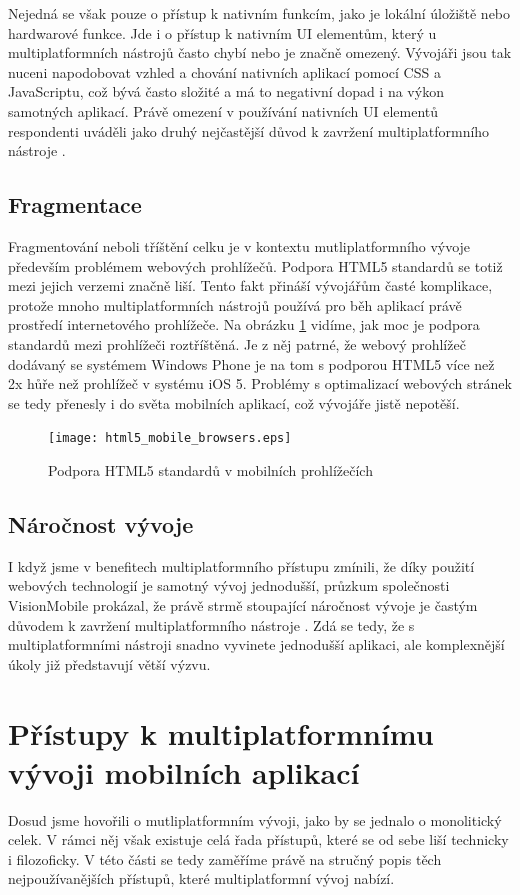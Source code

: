 Nejedná se však pouze o přístup k nativním funkcím, jako je lokální úložiště nebo hardwarové funkce. Jde i o přístup k nativním UI elementům, který u multiplatformních nástrojů často chybí nebo je značně omezený. Vývojáři jsou tak nuceni napodobovat vzhled a chování nativních aplikací pomocí CSS a JavaScriptu, což bývá často složité a má to negativní dopad i na výkon samotných aplikací. Právě omezení v používání nativních UI elementů respondenti uváděli jako druhý nejčastější důvod k zavržení multiplatformního nástroje \cite{visionmobile_survey}.

\subsection{Fragmentace}
Fragmentování neboli tříštění celku je v kontextu mutliplatformního vývoje především problémem webových prohlížečů. Podpora HTML5 standardů se totiž mezi jejich verzemi značně liší. Tento fakt přináší vývojářům časté komplikace, protože mnoho multiplatformních nástrojů používá pro běh aplikací právě prostředí internetového prohlížeče. Na obrázku \ref{fig:HTML5mobilniprohlizece} vidíme, jak moc je podpora standardů mezi prohlížeči roztříštěná. Je z něj patrné, že webový prohlížeč dodávaný se systémem Windows Phone je na tom s podporou HTML5 více než 2x hůře než prohlížeč v systému iOS 5. Problémy s optimalizací webových stránek se tedy přenesly i do světa mobilních aplikací, což vývojáře jistě nepotěší.

\begin{figure}\centering
\texttt{[image: html5\_mobile\_browsers.eps]}
\caption{Podpora HTML5 standardů v mobilních prohlížečích \cite{visionmobile_survey}}
\label{fig:HTML5mobilniprohlizece}
\end{figure}

\subsection{Náročnost vývoje}
I když jsme v benefitech multiplatformního přístupu zmínili, že díky použití webových technologií je samotný vývoj jednodušší, průzkum společnosti VisionMobile prokázal, že právě strmě stoupající náročnost vývoje je častým důvodem k zavržení multiplatformního nástroje \cite{visionmobile_survey}. Zdá se tedy, že s multiplatformními nástroji snadno vyvinete jednodušší aplikaci, ale komplexnější úkoly již představují větší výzvu.

\section{Přístupy k multiplatformnímu vývoji mobilních aplikací}
Dosud jsme hovořili o mutliplatformním vývoji, jako by se jednalo o monolitický celek. V rámci něj však existuje celá řada přístupů, které se od sebe liší technicky i filozoficky. V této části se tedy zaměříme právě na stručný popis těch nejpoužívanějších přístupů, které multiplatformní vývoj nabízí.

